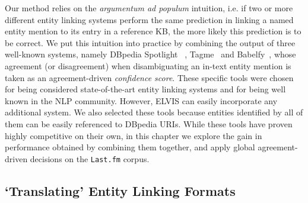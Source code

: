Our method relies on the \textit{argumentum ad populum} intuition, i.e. if two or more different entity linking systems perform the same prediction in linking a named entity mention to its entry in a reference KB, the more likely this prediction is to be correct. We put this intuition into practice by combining the output of three well-known systems, namely DBpedia Spotlight~\citep{Mendes2011} , Tagme~\citep{Ferragina2012} and Babelfy~\citep{Moroetal2014b}, whose agreement (or disagreement) when disambiguating an in-text entity mention is taken as an agreement-driven \textit{confidence score}. These specific tools were chosen for being considered state-of-the-art entity linking systems and for being well known in the NLP community. However, \textsc{ELVIS} can easily incorporate any additional system. We also selected these tools because entities identified by all of them can be easily referenced to DBpedia URIs. 
While these tools have proven highly competitive on their own, in this chapter we explore the gain in performance obtained by combining them together, and apply global agreement-driven decisions on the \texttt{Last.fm} corpus.


\subsection{`Translating' Entity Linking Formats}
\label{sec:linking:unification}

